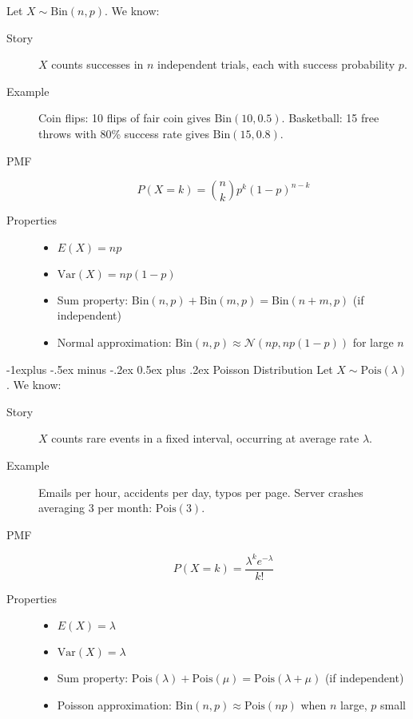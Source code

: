 \documentclass[10pt,landscape]{article}
\makeatletter
\newcommand{\var}{\textrm{Var}}
\newcommand{\N}{\mathcal{N}}
\newcommand{\Bin}{\textrm{Bin}}
\newcommand{\Pois}{\textrm{Pois}}
\renewcommand{\subsection}{\@startsection{subsection}{2}{0mm}%
                                {-1explus -.5ex minus -.2ex}%
                                {0.5ex plus .2ex}%
                                {\normalfont\normalsize\bfseries}}
\makeatother
\begin{document}
\begin{multicols}{3}
Let $X \sim \Bin(n, p)$. We know:

\begin{description}
    \item[Story] $X$ counts successes in $n$ independent trials, each with success probability $p$.

    \item[Example] Coin flips: 10 flips of fair coin gives $\Bin(10, 0.5)$. Basketball: 15 free throws with 80\% success rate gives $\Bin(15, 0.8)$.

    \item[PMF]
    \[P(X = k) = \binom{n}{k} p^k (1-p)^{n-k}\]

    \item[Properties]
    \begin{itemize}
        \item $E(X) = np$
        \item $\var(X) = np(1-p)$
        \item Sum property: $\Bin(n,p) + \Bin(m,p) = \Bin(n+m,p)$ (if independent)
        \item Normal approximation: $\Bin(n,p) \approx \N(np, np(1-p))$ for large $n$
    \end{itemize}
\end{description}

\subsection{Poisson Distribution}
Let $X \sim \Pois(\lambda)$. We know:

\begin{description}
    \item[Story] $X$ counts rare events in a fixed interval, occurring at average rate $\lambda$.

    \item[Example] Emails per hour, accidents per day, typos per page. Server crashes averaging 3 per month: $\Pois(3)$.

    \item[PMF]
    \[P(X = k) = \frac{\lambda^k e^{-\lambda}}{k!}\]

    \item[Properties]
    \begin{itemize}
        \item $E(X) = \lambda$
        \item $\var(X) = \lambda$
        \item Sum property: $\Pois(\lambda) + \Pois(\mu) = \Pois(\lambda + \mu)$ (if independent)
        \item Poisson approximation: $\Bin(n,p) \approx \Pois(np)$ when $n$ large, $p$ small
    \end{itemize}
\end{description}


\end{multicols}
\end{document}

